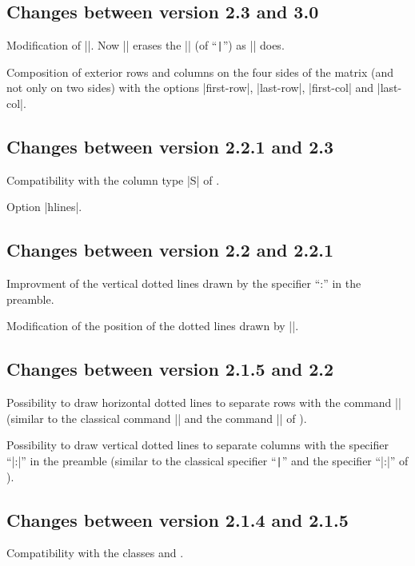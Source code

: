 \documentclass[dvipsnames]{article}%
\begin{document}
\subsection*{Changes between version 2.3 and 3.0}

Modification of |\Hdotsfor|. Now |\Hdotsfor| erases the |\vlines| (of ``\verb+|+'')
as |\hdotsfor| does.

Composition of exterior rows and columns on the four sides of the matrix (and
not only on two sides) with the options |first-row|, |last-row|, |first-col|
and |last-col|.

\subsection*{Changes between version 2.2.1 and 2.3}

Compatibility with the column type |S| of .

Option |hlines|.

\subsection*{Changes between version 2.2 and 2.2.1}

Improvment of the vertical dotted lines drawn by the specifier ``:'' in the
preamble. 

Modification of the position of the dotted lines drawn by |\hdottedline|.

\subsection*{Changes between version 2.1.5 and 2.2}

Possibility to draw horizontal dotted lines to separate rows with the command 
|\hdottedline| (similar to the classical command |\hline| and the command
|\hdashline| of ). 

Possibility to draw vertical dotted lines to separate columns with the
specifier ``|:|'' in the preamble (similar to the classical specifier
``\verb+|+'' and the specifier ``|:|'' of ).

\subsection*{Changes between version 2.1.4 and 2.1.5}

Compatibility with the classes  and .
\end{document}
